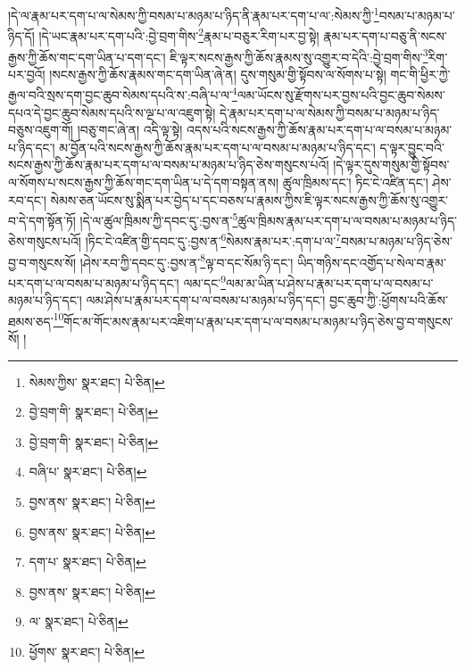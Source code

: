 །དེ་ལ་རྣམ་པར་དག་པ་ལ་སེམས་ཀྱི་བསམ་པ་མཉམ་པ་ཉིད་ནི་རྣམ་པར་དག་པ་ལ་:སེམས་ཀྱི་\footnote{སེམས་ཀྱིས་  སྣར་ཐང་།  པེ་ཅིན། }བསམ་པ་མཉམ་པ་ཉིད་དོ། །དེ་ཡང་རྣམ་པར་དག་པའི་:བྱེ་བྲག་གིས་\footnote{བྱེ་བྲག་གི་  སྣར་ཐང་།  པེ་ཅིན། }རྣམ་པ་བཅུར་རིག་པར་བྱ་སྟེ། རྣམ་པར་དག་པ་བཅུ་ནི་སངས་རྒྱས་ཀྱི་ཆོས་གང་དག་ཡིན་པ་དག་དང་། ཇི་ལྟར་སངས་རྒྱས་ཀྱི་ཆོས་རྣམས་སུ་འགྱུར་བ་དེའི་:བྱེ་བྲག་གིས་\footnote{བྱེ་བྲག་གི་  སྣར་ཐང་།  པེ་ཅིན། }རིག་པར་བྱའོ། །སངས་རྒྱས་ཀྱི་ཆོས་རྣམས་གང་དག་ཡིན་ཞེ་ན། དུས་གསུམ་གྱི་སྟོབས་ལ་སོགས་པ་སྟེ། གང་གི་ཕྱིར་ཀྱེ་རྒྱལ་བའི་སྲས་དག་བྱང་ཆུབ་སེམས་དཔའི་ས་:བཞི་པ་ལ་\footnote{བཞི་པ་  སྣར་ཐང་།  པེ་ཅིན། }ལམ་ཡོངས་སུ་རྫོགས་པར་བྱས་པའི་བྱང་ཆུབ་སེམས་དཔའ་དེ་བྱང་ཆུབ་སེམས་དཔའི་ས་ལྔ་པ་ལ་འཇུག་སྟེ། དེ་རྣམ་པར་དག་པ་ལ་སེམས་ཀྱི་བསམ་པ་མཉམ་པ་ཉིད་བཅུས་འཇུག་གོ། །བཅུ་གང་ཞེ་ན། འདི་ལྟ་སྟེ། འདས་པའི་སངས་རྒྱས་ཀྱི་ཆོས་རྣམ་པར་དག་པ་ལ་བསམ་པ་མཉམ་པ་ཉིད་དང་། མ་བྱོན་པའི་སངས་རྒྱས་ཀྱི་ཆོས་རྣམ་པར་དག་པ་ལ་བསམ་པ་མཉམ་པ་ཉིད་དང་། ད་ལྟར་བྱུང་བའི་སངས་རྒྱས་ཀྱི་ཆོས་རྣམ་པར་དག་པ་ལ་བསམ་པ་མཉམ་པ་ཉིད་ཅེས་གསུངས་པའོ། །དེ་ལྟར་དུས་གསུམ་གྱི་སྟོབས་ལ་སོགས་པ་སངས་རྒྱས་ཀྱི་ཆོས་གང་དག་ཡིན་པ་དེ་དག་བསྟན་ནས། ཚུལ་ཁྲིམས་དང་། ཏིང་ངེ་འཛིན་དང་། ཤེས་རབ་དང་། སེམས་ཅན་ཡོངས་སུ་སྨིན་པར་བྱེད་པ་དང་བཅས་པ་རྣམས་ཀྱིས་ཇི་ལྟར་སངས་རྒྱས་ཀྱི་ཆོས་སུ་འགྱུར་བ་དེ་དག་སྟོན་ཏོ། །དེ་ལ་ཚུལ་ཁྲིམས་ཀྱི་དབང་དུ་:བྱས་ན་\footnote{བྱས་ནས་  སྣར་ཐང་།  པེ་ཅིན། }ཚུལ་ཁྲིམས་རྣམ་པར་དག་པ་ལ་བསམ་པ་མཉམ་པ་ཉིད་ཅེས་གསུངས་པའོ། །ཏིང་ངེ་འཛིན་གྱི་དབང་དུ་:བྱས་ན་\footnote{བྱས་ནས་  སྣར་ཐང་།  པེ་ཅིན། }སེམས་རྣམ་པར་:དག་པ་ལ་\footnote{དག་པ་  སྣར་ཐང་།  པེ་ཅིན། }བསམ་པ་མཉམ་པ་ཉིད་ཅེས་བྱ་བ་གསུངས་སོ། །ཤེས་རབ་ཀྱི་དབང་དུ་:བྱས་ན་\footnote{བྱས་ནས་  སྣར་ཐང་།  པེ་ཅིན། }ལྟ་བ་དང་སོམ་ཉི་དང་། ཡིད་གཉིས་དང་འགྱོད་པ་སེལ་བ་རྣམ་པར་དག་པ་ལ་བསམ་པ་མཉམ་པ་ཉིད་དང་། ལམ་དང་\footnote{ལ་  སྣར་ཐང་།  པེ་ཅིན། }ལམ་མ་ཡིན་པ་ཤེས་པ་རྣམ་པར་དག་པ་ལ་བསམ་པ་མཉམ་པ་ཉིད་དང་། ལམ་ཤེས་པ་རྣམ་པར་དག་པ་ལ་བསམ་པ་མཉམ་པ་ཉིད་དང་། བྱང་ཆུབ་ཀྱི་:ཕྱོགས་པའི་ཆོས་ཐམས་ཅད་\footnote{ཕྱོགས་  སྣར་ཐང་།  པེ་ཅིན། }གོང་མ་གོང་མས་རྣམ་པར་འཇིག་པ་རྣམ་པར་དག་པ་ལ་བསམ་པ་མཉམ་པ་ཉིད་ཅེས་བྱ་བ་གསུངས་སོ། །
